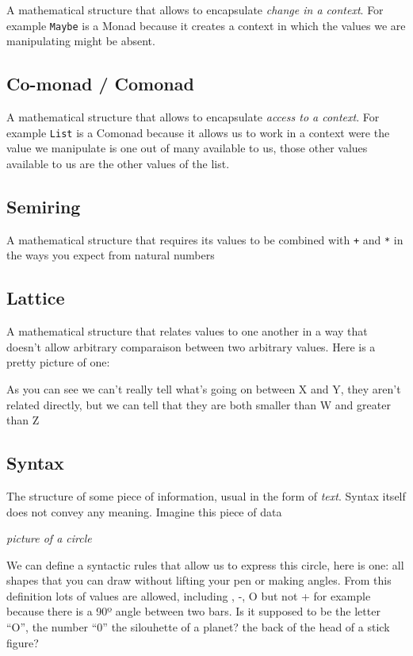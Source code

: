 \documentclass[
]{article}
\begin{document}
A mathematical structure that allows to encapsulate \emph{change in a
context}. For example \texttt{Maybe} is a Monad because it creates a
context in which the values we are manipulating might be absent.

\hypertarget{co-monad-comonad}{%
\subsection{Co-monad / Comonad}\label{co-monad-comonad}}

A mathematical structure that allows to encapsulate \emph{access to a
context}. For example \texttt{List} is a Comonad because it allows us to
work in a context were the value we manipulate is one out of many
available to us, those other values available to us are the other values
of the list.

\hypertarget{semiring}{%
\subsection{Semiring}\label{semiring}}

A mathematical structure that requires its values to be combined with
\texttt{+} and \texttt{*} in the ways you expect from natural numbers

\hypertarget{lattice}{%
\subsection{Lattice}\label{lattice}}

A mathematical structure that relates values to one another in a way
that doesn't allow arbitrary comparaison between two arbitrary values.
Here is a pretty picture of one:

As you can see we can't really tell what's going on between X and Y,
they aren't related directly, but we can tell that they are both smaller
than W and greater than Z

\hypertarget{syntax-1}{%
\subsection{Syntax}\label{syntax-1}}

The structure of some piece of information, usual in the form of
\emph{text}. Syntax itself does not convey any meaning. Imagine this
piece of data

\emph{picture of a circle}

We can define a syntactic rules that allow us to express this circle,
here is one: all shapes that you can draw without lifting your pen or
making angles. From this definition lots of values are allowed,
including \textbar, -, O but not + for example because there is a 90º
angle between two bars. Is it supposed to be the letter ``O'', the
number ``0'' the silouhette of a planet? the back of the head of a stick
figure?
\end{document}
